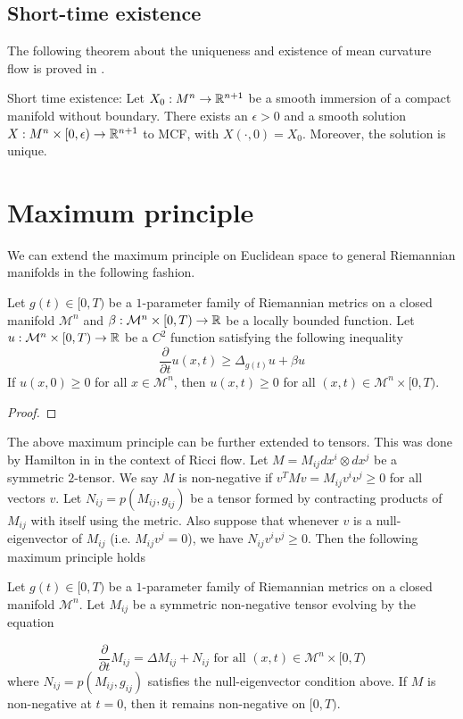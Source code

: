 \subsection{Short-time existence}
The following theorem about the uniqueness and existence of mean curvature flow is proved in \cite{andrews2022extrinsic}. 
\begin{thm}
    Short time existence: Let $ X_{0}: M^{n} \to \mathbb{R}^{n+1} $ be a smooth immersion of a compact manifold without boundary. There exists an $ \epsilon >0 $ and a smooth solution $ X : M^{n} \times [0, \epsilon) \to \mathbb{R}^{n+1}$ to MCF, with $ X( \cdot, 0) = X_{0} $. Moreover, the solution is unique.
\end{thm}

\section{Maximum principle}\label{max}
We can extend the maximum principle on Euclidean space to general Riemannian manifolds in the following fashion. 
\begin{lemma}
    Let $ g(t) \in [0,T) $ be a $ 1 $-parameter family of Riemannian metrics on a closed manifold $ \mathcal{M}^{n} $ and $ \beta : \mathcal{M}^{n} \times [0,T) \to \mathbb{R} $ be a locally bounded function. Let $ u : \mathcal{M}^{n} \times [0,T) \to \mathbb{R}$ be a $ C^{2} $ function satisfying the following inequality 
    \[ \frac{ \partial}{ \partial t}u(x,t) \ge \Delta_{g(t)}u + \beta u\]
    If $ u(x,0) \ge 0 $ for all $ x \in \mathcal{M}^{n}$, then $ u(x,t) \ge 0 $ for all $ (x,t) \in \mathcal{M}^{n} \times [0,T) $.
\end{lemma}

\begin{proof}
    
\end{proof}

The above maximum principle can be further extended to tensors. This was done by Hamilton in \cite{hamilton1982three} in the context of Ricci flow. Let $ M = M_{ij}dx^{i}\otimes dx^{j} $ be a symmetric $ 2 $-tensor. We say $ M $ is non-negative if $ v^{T}Mv = M_{ij}v^{i}v^{j} \ge 0 $ for all vectors $ v $. Let $ N_{ij} = p(M_{ij},g_{ij}) $ be a tensor formed by contracting products of $ M_{ij} $ with itself using the metric. Also suppose that whenever $ v $ is a null-eigenvector of $ M_{ij} $ (i.e. $ M_{ij}v^{j} = 0 $), we have $ N_{ij}v^{i}v^{j} \ge 0 $. Then the following maximum principle holds

\begin{lemma}
	Let $ g(t) \in [0,T)  $ be a $ 1 $-parameter family of Riemannian metrics on a closed manifold $ \mathcal{M}^{n} $. Let $ M_{ij} $ be a symmetric non-negative tensor evolving by the equation 
	
        \[ \frac{ \partial}{ \partial t}M_{ij} = \Delta M_{ij} + N_{ij}  \text{ for all } (x,t) \in  \mathcal{M}^{n} \times [0,T) \]
	where $ N_{ij} = p(M_{ij},g_{ij}) $ satisfies the null-eigenvector condition above. If $ M $ is non-negative at $ t=0 $, then it remains non-negative on $ [0,T) $.
\end{lemma}

